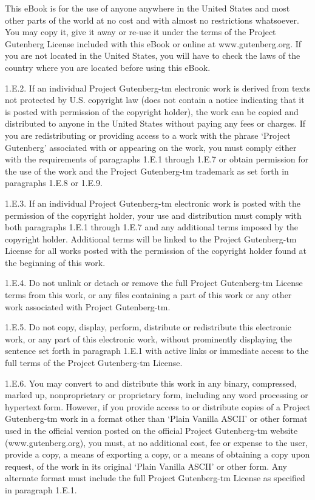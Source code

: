 \documentclass[oneside]{book}
\begin{document}
  This eBook is for the use of anyone anywhere in the United States and
  most other parts of the world at no cost and with almost no
  restrictions whatsoever. You may copy it, give it away or re-use it
  under the terms of the Project Gutenberg License included with this
  eBook or online at www.gutenberg.org. If you are not located in the
  United States, you will have to check the laws of the country where
  you are located before using this eBook.

1.E.2. If an individual Project Gutenberg-tm electronic work is
derived from texts not protected by U.S. copyright law (does not
contain a notice indicating that it is posted with permission of the
copyright holder), the work can be copied and distributed to anyone in
the United States without paying any fees or charges. If you are
redistributing or providing access to a work with the phrase `Project
Gutenberg' associated with or appearing on the work, you must comply
either with the requirements of paragraphs 1.E.1 through 1.E.7 or
obtain permission for the use of the work and the Project Gutenberg-tm
trademark as set forth in paragraphs 1.E.8 or 1.E.9.

1.E.3. If an individual Project Gutenberg-tm electronic work is posted
with the permission of the copyright holder, your use and distribution
must comply with both paragraphs 1.E.1 through 1.E.7 and any
additional terms imposed by the copyright holder. Additional terms
will be linked to the Project Gutenberg-tm License for all works
posted with the permission of the copyright holder found at the
beginning of this work.

1.E.4. Do not unlink or detach or remove the full Project Gutenberg-tm
License terms from this work, or any files containing a part of this
work or any other work associated with Project Gutenberg-tm.

1.E.5. Do not copy, display, perform, distribute or redistribute this
electronic work, or any part of this electronic work, without
prominently displaying the sentence set forth in paragraph 1.E.1 with
active links or immediate access to the full terms of the Project
Gutenberg-tm License.

1.E.6. You may convert to and distribute this work in any binary,
compressed, marked up, nonproprietary or proprietary form, including
any word processing or hypertext form. However, if you provide access
to or distribute copies of a Project Gutenberg-tm work in a format
other than `Plain Vanilla ASCII' or other format used in the official
version posted on the official Project Gutenberg-tm website
(www.gutenberg.org), you must, at no additional cost, fee or expense
to the user, provide a copy, a means of exporting a copy, or a means
of obtaining a copy upon request, of the work in its original `Plain
Vanilla ASCII' or other form. Any alternate format must include the
full Project Gutenberg-tm License as specified in paragraph 1.E.1.
\end{document}
